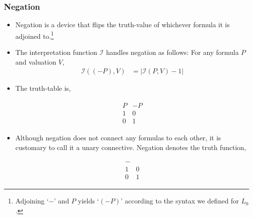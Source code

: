 \documentclass[11pt]{article}
\begin{document}
\subsubsection{Negation}

\begin{itemize}

\item Negation is a device that flips the truth-value of whichever formula it is
adjoined to.\footnote{Adjoining `$-$' and $P$ yields `$(-P)$' according to the
syntax we defined for $L_0$.} 

\item The interpretation function $\mathcal{I}$ handles negation as follows: For
any formula $P$ and valuation $V$,
\begin{align}
\mathcal{I}((-P),V) &= |\mathcal{I}(P,V) - 1|
\end{align}

\item The truth-table is,

\begin{align}
\begin{array}{c|c}
P & -P \\ \hline
1 & 0 \\
0 & 1 
\end{array}
\end{align}

\item Although negation does not connect any formulas to each other, it is
customary to call it a unary connective. Negation denotes the truth
function,

\begin{align}
\begin{array}{c|c}
- & \\ \hline
1 & 0 \\
0 & 1 
\end{array}
\end{align}

\end{itemize}
\end{document}

